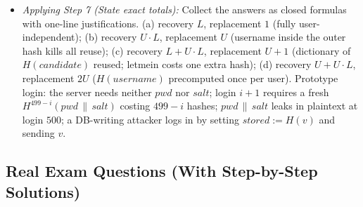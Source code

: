 \documentclass[12pt, a4paper]{article}
\begin{document}
\begin{itemize}
    \item \textit{Applying Step 7 (State exact totals):} Collect the answers as closed formulas with one-line justifications. (a) recovery $L$, replacement $1$ (fully user-independent); (b) recovery $U \cdot L$, replacement $U$ (username inside the outer hash kills all reuse); (c) recovery $L + U \cdot L$, replacement $U + 1$ (dictionary of $H(candidate)$ reused; letmein costs one extra hash); (d) recovery $U + U \cdot L$, replacement $2U$ ($H(username)$ precomputed once per user). Prototype login: the server needs neither $pwd$ nor $salt$; login $i+1$ requires a fresh $H^{499-i}(pwd \,\|\, salt)$ costing $499 - i$ hashes; $pwd \,\|\, salt$ leaks in plaintext at login $500$; a DB-writing attacker logs in by setting $stored := H(v)$ and sending $v$.
\end{itemize}

\subsection*{Real Exam Questions (With Step-by-Step Solutions)}
\end{document}
